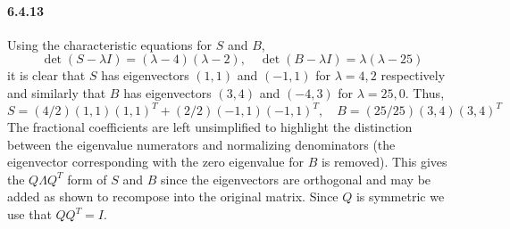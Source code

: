 \documentclass[10pt]{scrartcl}
\begin{document}
\paragraph{6.4.13}
Using the characteristic equations for $S$ and $B$,
\[\det{(S - \lambda I)}=(\lambda-4)(\lambda-2),\quad \det{(B-\lambda I)}=\lambda(\lambda-25)\]
it is clear that $S$ has eigenvectors $(1,1)$ and $(-1,1)$ for $\lambda=4,2$ respectively and similarly that $B$ has eigenvectors $(3,4)$ and $(-4,3)$ for $\lambda=25,0$. Thus,
\[S = (4/2)(1,1)(1,1)^T+(2/2)(-1,1)(-1,1)^T,\quad
B = (25/25)(3,4)(3,4)^T\]
The fractional coefficients are left unsimplified to highlight the distinction between the eigenvalue numerators and normalizing denominators (the eigenvector corresponding with the zero eigenvalue for $B$ is removed). This gives the $Q\Lambda Q^{T}$ form of $S$ and $B$ since the eigenvectors are orthogonal and may be added as shown to recompose into the original matrix. Since $Q$ is symmetric we use that $QQ^T = I$. 
\end{document}
